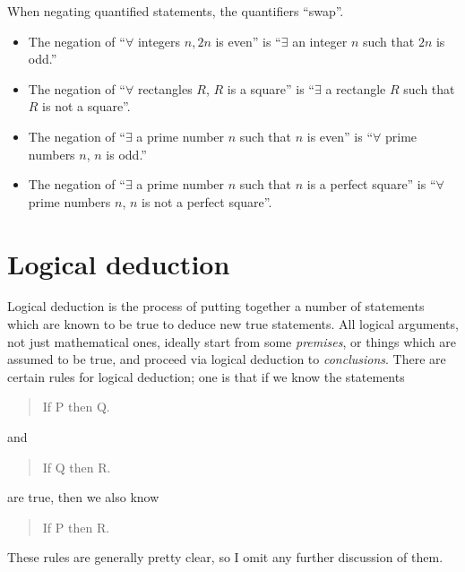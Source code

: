 \documentclass{tufte-book}
\begin{document}
When negating quantified statements, the quantifiers ``swap''.
\begin{itemize}
    \item The negation of ``$\forall$ integers $n, 2n$ is even'' is ``$\exists$ an integer $n$ such that $2n$ is odd.''
    \item The negation of ``$\forall$ rectangles $R$, $R$ is a square'' is ``$\exists$ a rectangle $R$ such that $R$ is not a square''.
    \item The negation of ``$\exists$ a prime number $n$ such that $n$ is even'' is ``$\forall$ prime numbers $n$, $n$ is odd.''
    \item The negation of ``$\exists$ a prime number $n$ such that $n$ is a perfect square'' is ``$\forall$ prime numbers $n$, $n$ is not a perfect square''.
\end{itemize}

\section{Logical deduction}
\label{sec:logical-deduction}

Logical deduction is the process of putting together a number of statements which are known to be true to deduce new true statements. All logical arguments, not just mathematical ones, ideally start from some \emph{premises}, or things which are assumed to be true, and proceed via logical deduction to \emph{conclusions}. There are certain rules for logical deduction; one is that if we know the statements
\begin{quote}
  If P then Q.
\end{quote}
and
\begin{quote}
  If Q then R.
\end{quote}
are true, then we also know
\begin{quote}
  If P then R. 
\end{quote}
These rules are generally pretty clear, so I omit any further discussion of them.
\end{document}
